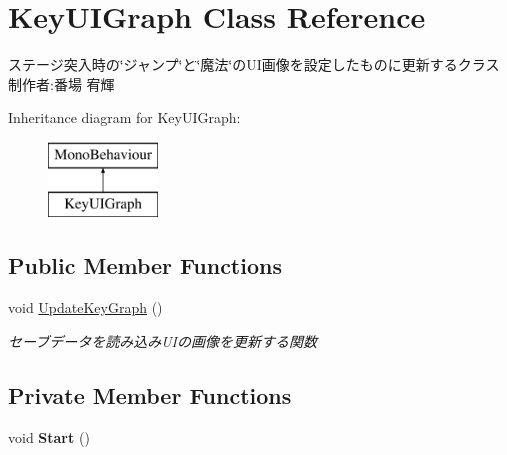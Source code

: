 \hypertarget{class_key_u_i_graph}{}\section{Key\+U\+I\+Graph Class Reference}
\label{class_key_u_i_graph}


ステージ突入時の\char`\"{}ジャンプ\char`\"{}と\char`\"{}魔法\char`\"{}の\+U\+I画像を設定したものに更新するクラス 制作者\+:番場 宥輝  


Inheritance diagram for Key\+U\+I\+Graph\+:\begin{figure}[H]
\begin{center}
\leavevmode
\includegraphics[height=2.000000cm]{class_key_u_i_graph}
\end{center}
\end{figure}
\subsection*{Public Member Functions}
\begin{DoxyCompactItemize}
\item 
void \hyperlink{class_key_u_i_graph_a1bf3620901c801f83589b5e7bfa8a309}{Update\+Key\+Graph} ()
\begin{DoxyCompactList}\small\item\em セーブデータを読み込み\+U\+Iの画像を更新する関数 \end{DoxyCompactList}\end{DoxyCompactItemize}
\subsection*{Private Member Functions}
\begin{DoxyCompactItemize}
\item 
\mbox{\label{class_key_u_i_graph_a81c0f20657319c7c9330ef189ee86f59}} 
void {\bfseries Start} ()
\end{DoxyCompactItemize}
